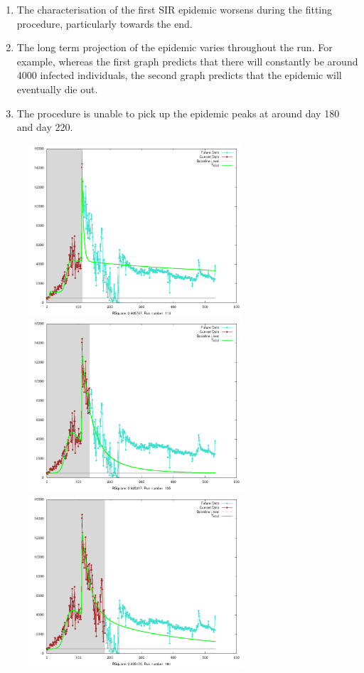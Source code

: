 \begin{enumerate}
  \item The characterisation of the first SIR epidemic worsens during
    the fitting procedure, particularly towards the end.
  \item The long term projection of the epidemic varies throughout the
    run. For example, whereas the first graph predicts that there will
    constantly be around 4000 infected individuals, the second graph
    predicts that the epidemic will eventually die out.
  \item The procedure is unable to pick up the epidemic peaks at
    around day 180 and day 220.
\end{enumerate}


\begin{centering}
\begin{figure}[h!]
  \includegraphics[width=8cm]{images/multi/badrt1.png}
  \includegraphics[width=8cm]{images/multi/badrt2.png}
  \includegraphics[width=8cm]{images/multi/badrt3.png}

\end{figure}
\end{centering}
